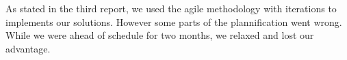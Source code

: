 As stated in the third report, we used the agile methodology with iterations to implements our solutions. However some parts of the plannification went wrong. While we were ahead of schedule for two months, we relaxed and lost our advantage.